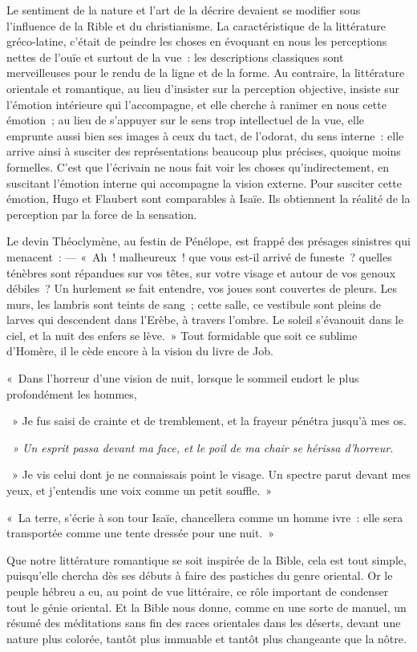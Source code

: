 \documentclass[french,twoside]{book} %
\begin{document}
Le sentiment de la nature et l’art de la décrire devaient se modifier sous l’influence de la Rible et du christianisme. La caractéristique de la littérature gréco-latine, c’était de peindre les choses en évoquant en nous les perceptions nettes de l’ouïe et surtout de la vue : les descriptions classiques sont merveilleuses pour le rendu de la ligne et de la forme. Au contraire, la littérature orientale et romantique, au lieu d’insister sur la perception objective, insiste sur l’émotion intérieure qui l’accompagne, et elle cherche à ranimer en nous cette émotion ; au lieu de s’appuyer sur le sens trop intellectuel de la vue, elle emprunte aussi bien ses images à ceux du tact, de l’odorat, du sens interne : elle arrive ainsi à susciter des représentations beaucoup plus précises, quoique moins formelles. C’est que l’écrivain ne nous fait voir les choses qu’indirectement, en suscitant l’émotion interne qui accompagne la vision externe. Pour susciter cette émotion, Hugo et Flaubert sont comparables à Isaïe. Ils obtiennent la réalité de la perception par la force de la sensation.\par
Le devin Théoclymène, au festin de Pénélope, est frappé des présages sinistres qui menacent : — « Ah ! malheureux ! que vous est-il arrivé de funeste ? quelles ténèbres sont répandues sur vos têtes, sur votre visage et autour de vos genoux débiles ? Un hurlement se fait entendre, vos joues sont couvertes de pleurs. Les murs, les lambris sont teints de sang ; cette salle, ce vestibule sont pleins de larves qui descendent dans l’Erèbe, à travers l’ombre. Le soleil s’évanouit dans le ciel, et la nuit des enfers se lève. » Tout formidable que soit ce sublime d’Homère, il le cède encore à la vision du livre de Job.\par
« Dans l’horreur d’une vision de nuit, lorsque le sommeil endort le plus profondément les hommes,\par
 » Je fus saisi de crainte et de tremblement, et la frayeur pénétra jusqu’à mes os.\par
{\itshape  » Un esprit passa devant ma face, et le poil de ma chair se hérissa d’horreur. }\par
 » Je vis celui dont je ne connaissais point le visage. Un spectre parut devant mes yeux, et j’entendis une voix comme un petit souffle. »\par
« La terre, s’écrie à son tour Isaïe, chancellera comme un homme ivre : elle sera transportée comme une tente dressée pour une nuit. »\par
Que notre littérature romantique se soit inspirée de la Bible, cela est tout simple, puisqu’elle chercha dès ses débuts à faire des pastiches du genre oriental. Or le peuple hébreu a eu, au point de vue littéraire, ce rôle important de condenser tout le génie oriental. Et la Bible nous donne, comme en une sorte de manuel, un résumé des méditations sans fin des races orientales dans les déserts, devant une nature plus colorée, tantôt plus immuable et tantôt plus changeante que la nôtre.
\end{document}
